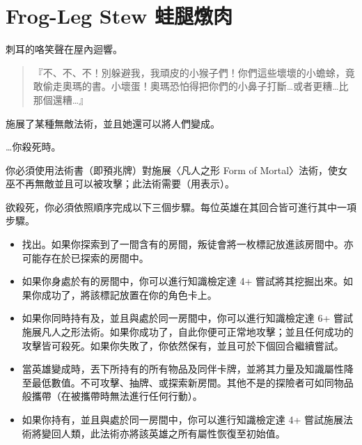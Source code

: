 
\chapter{Frog-Leg Stew 蛙腿燉肉}

\begin{HauntStory}
  刺耳的咯笑聲在屋內迴響。
  \begin{quote}
    『不、不、不！別躲避我，我頑皮的小猴子們！你們這些壞壞的小蟾蜍，竟敢偷走奧瑪的書。小壞蛋！奧瑪恐怕得把你們的小鼻子打斷…或者更糟…比那個還糟…』
  \end{quote}
\end{HauntStory}

施展了某種無敵法術，並且她還可以將人們變成。

…你殺死時。

你必須使用法術書（即預兆牌）對施展〈凡人之形 Form of Mortal〉法術，使女巫不再無敵並且可以被攻擊；此法術需要（用表示）。

欲殺死，你必須依照順序完成以下三個步驟。每位英雄在其回合皆可進行其中一項步驟。
\begin{itemize}
  \item 找出。如果你探索到了一間含有的房間，叛徒會將一枚標記放進該房間中。亦可能存在於已探索的房間中。
  \item 如果你身處於有的房間中，你可以進行知識檢定達 4+ 嘗試將其挖掘出來。如果你成功了，將該標記放置在你的角色卡上。
  \item 如果你同時持有及，並且與處於同一房間中，你可以進行知識檢定達 6+ 嘗試施展凡人之形法術。如果你成功了，自此你便可正常地攻擊；並且任何成功的攻擊皆可殺死。如果你失敗了，你依然保有，並且可於下個回合繼續嘗試。
\end{itemize}

\vfill\null\pagebreak

\vspace*{-1em}
\begin{itemize}
  \item 當英雄變成時，丟下所持有的所有物品及同伴卡牌，並將其力量及知識屬性降至最低數值。不可攻擊、抽牌、或探索新房間。其他不是的探險者可如同物品般攜帶（在被攜帶時無法進行任何行動）。
  \item 如果你持有，並且與處於同一房間中，你可以進行知識檢定達 4+ 嘗試施展法術將變回人類，此法術亦將該英雄之所有屬性恢復至初始值。
\end{itemize}

